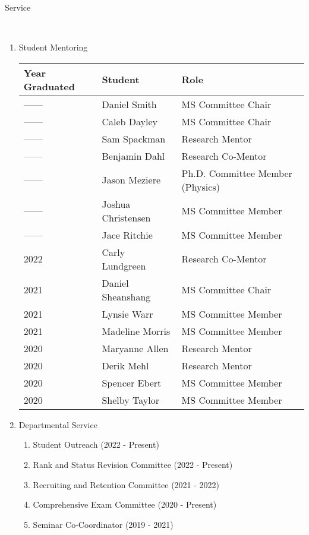 \documentclass[11pt]{article}
\newcommand{\head}[1]{ %
    \bigskip %
    \begin{large}\begin{bf}{#1}\end{bf}\end{large} %

    \ \\ [-1.3cm] %

    \hrulefill}
\begin{document}
\head{Service}
\begin{enumerate}[label=$\bullet$]

\item Student Mentoring

\begin{table}[H]
\centering
\begin{tabular}{lll}
  \hline
Year Graduated & Student & Role \\ 
  \hline
  ------ & Daniel Smith & MS Committee Chair \\
  ------ & Caleb Dayley & MS Committee Chair \\
  ------ & Sam Spackman & Research Mentor \\
  ------  & Benjamin Dahl & Research Co-Mentor  \\ 
  ------ & Jason Meziere & Ph.D. Committee Member (Physics) \\
  ------ & Joshua Christensen & MS Committee Member \\
  ------ & Jace Ritchie & MS Committee Member \\
2022  & Carly Lundgreen & Research Co-Mentor  \\ 
2021  & Daniel Sheanshang & MS Committee Chair  \\ 
2021  & Lynsie Warr & MS Committee Member  \\ 
2021  & Madeline Morris & MS Committee Member  \\ 
2020  & Maryanne Allen & Research Mentor  \\ 
2020  & Derik Mehl & Research Mentor \\ 
2020  & Spencer Ebert & MS Committee Member  \\ 
2020  & Shelby Taylor & MS Committee Member  \\ 
   \hline
\end{tabular}
\end{table}


\item Departmental Service
\begin{enumerate}[label=$\cdot$]
\item Student Outreach (2022 - Present)
\item Rank and Status Revision Committee (2022 - Present)
\item Recruiting and Retention Committee (2021 - 2022)
\item Comprehensive Exam Committee (2020 - Present)
\item Seminar Co-Coordinator (2019 - 2021)


\end{enumerate}
\end{enumerate}
\end{document}
